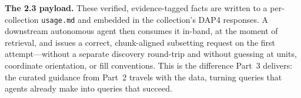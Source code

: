 \begin{tcolorbox}[colback=gray!5,colframe=gray!50,boxrule=0.5pt,
    title={\textbf{Worked example: from per-granule verification to a retrieval recipe}},
    fonttitle=\normalsize]
\textbf{The 2.3 payload.} These verified, evidence-tagged facts are written to
a per-collection \texttt{usage.md} and embedded in the collection's DAP4
responses. A downstream autonomous agent then consumes it in-band, at the
moment of retrieval, and issues a correct, chunk-aligned subsetting request on
the first attempt---without a separate discovery round-trip and without
guessing at units, coordinate orientation, or fill conventions. This is the
difference Part~3 delivers: the curated guidance from Part~2 travels with the
data, turning queries that agents already make into queries that succeed.
\end{tcolorbox}
